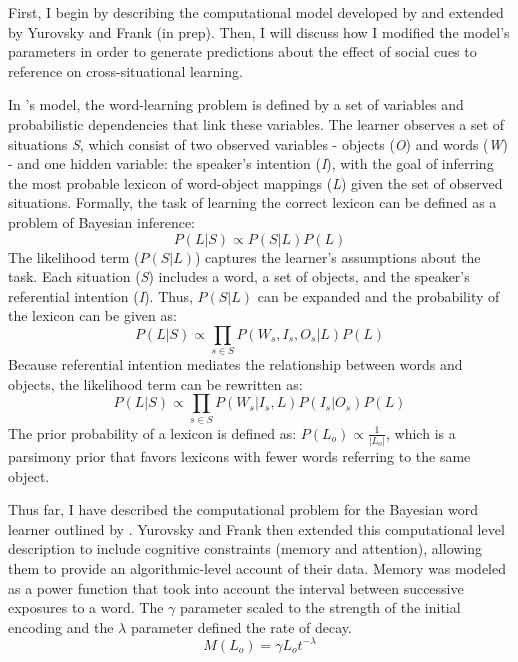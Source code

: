 \documentclass[10pt,letterpaper]{article}
\begin{document}
First, I begin by describing the computational model developed by  and extended by Yurovsky and Frank (in prep). Then, I will discuss how I modified the model's parameters in order to generate predictions about the effect of social cues to reference on cross-situational learning. 

In \citeauthor{frank2009using}'s model, the word-learning problem is defined by a set of variables and probabilistic dependencies that link these variables. The learner observes a set of situations \emph{S}, which consist of two observed variables - objects (\emph{O}) and words (\emph{W}) - and one hidden variable: the speaker's intention (\emph{I}), with the goal of inferring the most probable lexicon of word-object mappings (\emph{L}) given the set of observed situations. Formally, the task of learning the correct lexicon can be defined as a problem of Bayesian inference: 
%
\begin{equation}
\label{1}
P(L|S) \propto P(S|L)P(L)
\end{equation}
%
The likelihood term ($P(S|L)$) captures the learner's assumptions about the task. Each situation (\emph{S}) includes a word, a set of objects, and the speaker's referential intention (\emph{I}). Thus, $P(S|L)$ can be expanded and the probability of the lexicon can be given as: 
%
\begin{equation}
\label{2}
P(L|S) \propto \prod\limits_{s \in S}  P(W_s, I_s, O_s|L)P(L)
\end{equation}
%
Because referential intention mediates the relationship between words and objects, the likelihood term can be rewritten as:
%
\begin{equation}
\label{3}
P(L|S) \propto \prod\limits_{s \in S}  P(W_s|I_s, L)P(I_s|O_s)P(L)
\end{equation}
%
The prior probability of a lexicon is defined as: $P(L_o) \propto \frac{1}{|L_o|}$, which is a parsimony prior that favors lexicons with fewer words referring to the same object. 

Thus far, I have described the computational problem for the Bayesian word learner outlined by . Yurovsky and Frank then extended this computational level description to include cognitive constraints (memory and attention), allowing them to provide an algorithmic-level account of their data. Memory was modeled as a power function that took into account the interval between successive exposures to a word. The $\gamma$ parameter scaled to the strength of the initial encoding and the $\lambda$ parameter defined the rate of decay.
%
\begin{equation}
\label{4}
M(L_o) =  \gamma L_ot^{-\lambda}
\end{equation}
%
\end{document}
